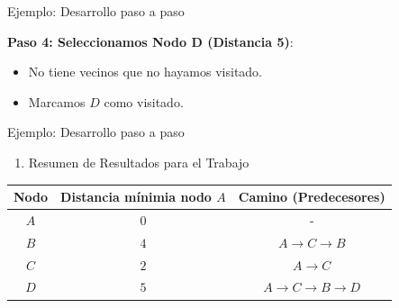\documentclass{beamer}
\begin{document}
    \begin{frame}{Ejemplo: Desarrollo paso a paso}
            \vspace{0.25cm}

            \textbf{Paso 4: Seleccionamos Nodo D (Distancia 5)}:
            
            \vspace{0.25cm}

            \begin{itemize}
                \item No tiene vecinos que no hayamos visitado.

                \vspace{0.25cm}

                \item Marcamos $D$ como visitado.
            \end{itemize}
            \begin{center}
        \end{center}
    \end{frame}

     \begin{frame}{Ejemplo: Desarrollo paso a paso}
        \begin{enumerate}
            \item[3.] Resumen de Resultados para el Trabajo
        \end{enumerate}

        \vspace{0.25cm}
        \begin{center}
        \begin{tabular}{|c|c|c|}
            \hline
            \textbf{Nodo} & \textbf{Distancia mínimia nodo $A$} & \textbf{Camino (Predecesores)} \\ \hline
            $A$ & $0$ & - \\ \hline
            $B$ & $4$ & $A \rightarrow C \rightarrow B$ \\ \hline
            $C$ & $2$ & $A \rightarrow C$ \\ \hline
            $D$ & $5$ & $A \rightarrow C \rightarrow B \rightarrow D$ \\ 
            \hline
        \end{tabular}
        \end{center}
    \end{frame}
\end{document}
